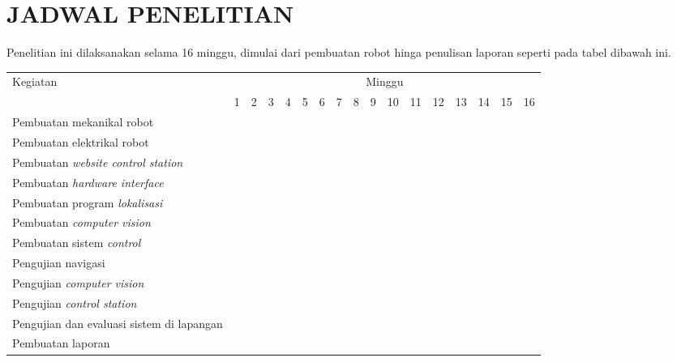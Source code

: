 \chapter{JADWAL PENELITIAN}
Penelitian ini dilaksanakan selama 16 minggu, dimulai dari pembuatan robot hinga penulisan laporan seperti pada tabel dibawah ini.
\newcommand{\w}{}
\newcommand{\G}{\cellcolor{gray}}
\begin{table}[H]
  \label{tbl:timeline}
  \begin{tabular}{|p{3.5cm}|c|c|c|c|c|c|c|c|c|c|c|c|c|c|c|c|}
    \hline
    \multirow{2}{*}{Kegiatan} & \multicolumn{16}{|c|}{Minggu} \\
    \cline{2-17}
                              & 1  & 2  & 3  & 4  & 5  & 6  & 7  & 8  & 9  & 10 & 11 & 12 & 13 & 14 & 15 & 16 \\
    \hline
    Pembuatan mekanikal robot & \G & \w & \w & \w & \w & \w & \w & \w & \w & \w & \w & \w & \w & \w & \w & \w \\
    \hline
    Pembuatan elektrikal robot & \G & \G & \w & \w & \w & \w & \w & \w & \w & \w & \w & \w & \w & \w & \w & \w \\
    \hline
    Pembuatan \emph{website control station} & \G & \G & \G & \w & \w & \w & \w & \w & \w & \w & \w & \w & \w & \w & \w & \w \\
    \hline
    Pembuatan \emph{hardware interface} & \w & \G & \w & \w & \w & \w & \w & \w & \w & \w & \w & \w & \w & \w & \w & \w \\
    \hline
    Pembuatan program \emph{lokalisasi} & \w & \G & \G & \G & \w & \w & \w & \w & \w & \w & \w & \w & \w & \w & \w & \w \\
    \hline
    Pembuatan \emph{computer vision} & \w & \w & \w & \G & \G & \w & \w & \w & \w & \w & \w & \w & \w & \w & \w & \w \\
    \hline
    Pembuatan sistem \emph{control} & \w & \w & \w & \w & \w & \G & \w & \w & \w & \w & \w & \w & \w & \w & \w & \w \\
    \hline
    Pengujian navigasi & \w & \w & \w & \w & \w & \G & \G & \w & \w & \w & \w & \w & \w & \w & \w & \w \\
    \hline
    Pengujian \emph{computer vision} & \w & \w & \w & \w & \w & \w & \G & \w & \w & \w & \w & \w & \w & \w & \w & \w \\
    \hline
    Pengujian \emph{control station} & \w & \w & \w & \w & \w & \w & \w & \G & \G & \w & \w & \w & \w & \w & \w & \w \\
    \hline
    Pengujian dan evaluasi sistem di lapangan & \w & \w & \w & \w & \w & \G & \G & \G & \G & \G & \G & \w & \w & \w & \w & \w \\
    \hline
    Pembuatan laporan & \w & \w & \w & \w & \w & \G & \G & \G & \G & \G & \G & \G & \G & \G & \G & \G \\
    \hline
  \end{tabular}
\end{table}
